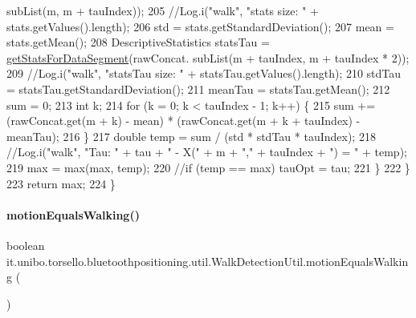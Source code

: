 \begin{DoxyCode}
      subList(m, m + tauIndex));
205                 \textcolor{comment}{//Log.i("walk", "stats size: " + stats.getValues().length);}
206                 std = stats.getStandardDeviation();
207                 mean = stats.getMean();
208                 DescriptiveStatistics statsTau = \hyperlink{classit_1_1unibo_1_1torsello_1_1bluetoothpositioning_1_1util_1_1WalkDetectionUtil_a2a153d4d32a5684f7be18d7ee88daacd_a2a153d4d32a5684f7be18d7ee88daacd}{getStatsForDataSegment}(rawConcat.
      subList(m + tauIndex, m + tauIndex * 2));
209                 \textcolor{comment}{//Log.i("walk", "statsTau size: " + statsTau.getValues().length);}
210                 stdTau = statsTau.getStandardDeviation();
211                 meanTau = statsTau.getMean();
212                 sum = 0;
213                 \textcolor{keywordtype}{int} k;
214                 \textcolor{keywordflow}{for} (k = 0; k < tauIndex - 1; k++) \{
215                     sum += (rawConcat.get(m + k) - mean) * (rawConcat.get(m + k + tauIndex) - meanTau);
216                 \}
217                 \textcolor{keywordtype}{double} temp = sum / (std * stdTau * tauIndex);
218                 \textcolor{comment}{//Log.i("walk", "Tau: " + tau + " - X(" + m + "," + tauIndex + ") = " + temp);}
219                 max = max(max, temp);
220                 \textcolor{comment}{//if (temp == max) tauOpt = tau;}
221             \}
222         \}
223         \textcolor{keywordflow}{return} max;
224     \}
\end{DoxyCode}
\hypertarget{classit_1_1unibo_1_1torsello_1_1bluetoothpositioning_1_1util_1_1WalkDetectionUtil_ab52011f5635c827e80de25d4b18e57bd_ab52011f5635c827e80de25d4b18e57bd}{}\label{classit_1_1unibo_1_1torsello_1_1bluetoothpositioning_1_1util_1_1WalkDetectionUtil_ab52011f5635c827e80de25d4b18e57bd_ab52011f5635c827e80de25d4b18e57bd} 
\paragraph{\texorpdfstring{motion\+Equals\+Walking()}{motionEqualsWalking()}}
{\footnotesize\ttfamily boolean it.\+unibo.\+torsello.\+bluetoothpositioning.\+util.\+Walk\+Detection\+Util.\+motion\+Equals\+Walking (\begin{DoxyParamCaption}{ }\end{DoxyParamCaption})\hspace{0.3cm}{\ttfamily [private]}}


